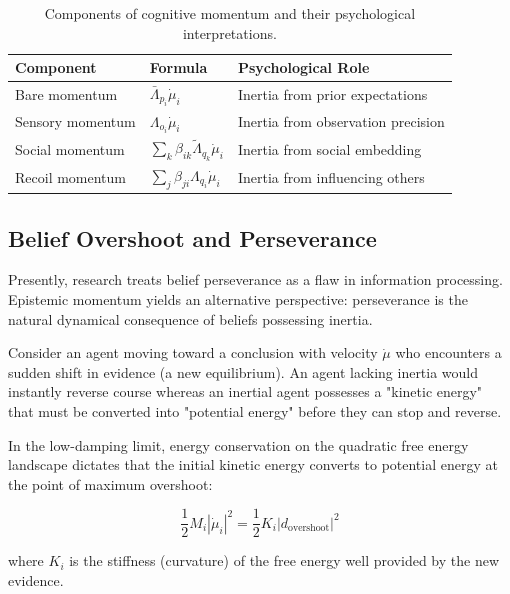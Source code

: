 \documentclass[12pt]{article}
\begin{document}
\begin{table}[ht]
\centering
\caption{Components of cognitive momentum and their psychological interpretations.}
\label{tab:momentum-components}
\renewcommand{\arraystretch}{1.3}
\begin{tabular}{@{} l l l @{}}
\toprule
\textbf{Component} & \textbf{Formula} & \textbf{Psychological Role} \\
\midrule
Bare momentum & $\bar{\Lambda}_{p_i}\dot{\mu}_i$ & Inertia from prior expectations \\
Sensory momentum & $\Lambda_{o_i}\dot{\mu}_i$ & Inertia from observation precision \\
Social momentum & $\sum_k\beta_{ik}\tilde{\Lambda}_{q_k}\dot{\mu}_i$ & Inertia from social embedding \\
Recoil momentum & $\sum_j\beta_{ji}\Lambda_{q_i}\dot{\mu}_i$ & Inertia from influencing others \\
\bottomrule

\end{tabular}
\end{table}

\subsection{Belief Overshoot and Perseverance}\label{sec:overshoot}

Presently, research treats belief perseverance as a flaw in information processing. Epistemic momentum yields an alternative perspective: perseverance is the natural dynamical consequence of beliefs possessing inertia.

Consider an agent moving toward a conclusion with velocity $\dot{\mu}$ who encounters a sudden shift in evidence (a new equilibrium). An agent lacking inertia would instantly reverse course whereas an inertial agent possesses a "kinetic energy" that must be converted into "potential energy" before they can stop and reverse.

In the low-damping limit, energy conservation on the quadratic free energy landscape dictates that the initial kinetic energy converts to potential energy at the point of maximum overshoot:

\begin{equation}
\frac{1}{2} M_i |\dot{\mu}_i|^2 = \frac{1}{2} K_i |d_{\text{overshoot}}|^2
\end{equation}

where $K_i$ is the stiffness (curvature) of the free energy well provided by the new evidence. 
\end{document}
